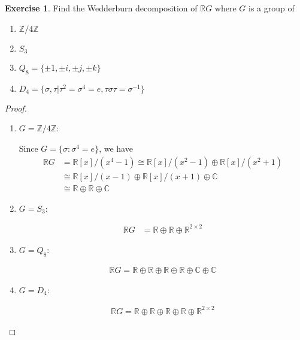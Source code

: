 \documentclass[12pt]{extarticle}
\newcommand{\set}[1]{\{#1\}}
\newcommand{\R}{\mathbb{R}}
\newcommand{\C}{\mathbb{C}}
\newcommand{\Z}{\mathbb{Z}}
\newcommand{\<}{\langle}
\renewcommand{\>}{\rangle}
\theoremstyle{definition}
\newtheorem{exercise}{Exercise}
\begin{document}
\begin{exercise}
  Find the Wedderburn decomposition of $\R G$ where $G$ is a group of
  \begin{enumerate}
  \item
    $\Z / 4 \Z$
  \item
    $S_3$
  \item
    $Q_8 = \set{\pm 1, \pm i, \pm j, \pm k}$
  \item
    $D_4 = \set{ \sigma, \tau | \tau^2 = \sigma^4 = e, \tau \sigma \tau = \sigma^{-1}}$
  \end{enumerate}
\end{exercise}
\begin{proof}
  \begin{enumerate}
  \item
    $G=\Z / 4 \Z$:

    Since $G = \set{\sigma: \sigma^4=e}$, we have 
    \begin{align*}
      \R G &= \R[x]/(x^4-1) \cong \R[x]/(x^2-1) \oplus \R[x]/(x^2+1) \\
      &\cong \R[x]/(x-1) \oplus \R[x]/(x+1) \oplus \C \\
      &\cong \R \oplus \R \oplus \C
    \end{align*}
  \item
    $G = S_3$:
    
    \begin{align*}
      \R G &= \R \oplus \R \oplus \R^{2 \times 2}
    \end{align*}

  \item
    $G = Q_8$:

    \begin{align*}
      \R G = \R \oplus \R \oplus \R \oplus \R \oplus \C \oplus \C
    \end{align*}

  \item
    $G = D_4$:
    
    \begin{align*}
      \R G = \R \oplus \R \oplus \R \oplus \R \oplus \R^{2\times2}
    \end{align*}
    
  \end{enumerate}
\end{proof}
\end{document}
